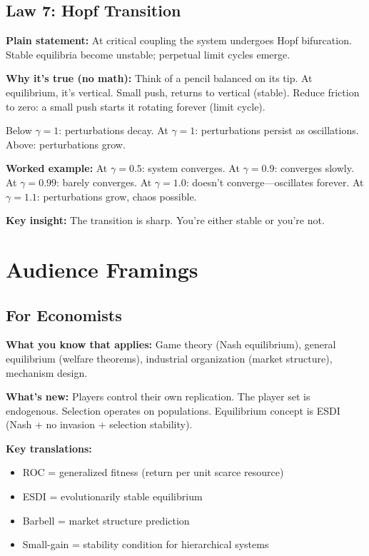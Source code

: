 \documentclass[12pt]{article}
\begin{document}
\subsection{Law 7: Hopf Transition}

\textbf{Plain statement:} At critical coupling the system undergoes Hopf bifurcation. Stable equilibria become unstable; perpetual limit cycles emerge.

\textbf{Why it's true (no math):} Think of a pencil balanced on its tip. At equilibrium, it's vertical. Small push, returns to vertical (stable). Reduce friction to zero: a small push starts it rotating forever (limit cycle).

Below $\gamma = 1$: perturbations decay. At $\gamma = 1$: perturbations persist as oscillations. Above: perturbations grow.

\textbf{Worked example:} At $\gamma = 0.5$: system converges. At $\gamma = 0.9$: converges slowly. At $\gamma = 0.99$: barely converges. At $\gamma = 1.0$: doesn't converge---oscillates forever. At $\gamma = 1.1$: perturbations grow, chaos possible.

\textbf{Key insight:} The transition is sharp. You're either stable or you're not.


\section{Audience Framings}
\label{app:audiences}

\subsection{For Economists}

\textbf{What you know that applies:} Game theory (Nash equilibrium), general equilibrium (welfare theorems), industrial organization (market structure), mechanism design.

\textbf{What's new:} Players control their own replication. The player set is endogenous. Selection operates on populations. Equilibrium concept is ESDI (Nash + no invasion + selection stability).

\textbf{Key translations:}
\begin{itemize}[nosep]
\item ROC = generalized fitness (return per unit scarce resource)
\item ESDI = evolutionarily stable equilibrium
\item Barbell = market structure prediction
\item Small-gain = stability condition for hierarchical systems
\end{itemize}
\end{document}
